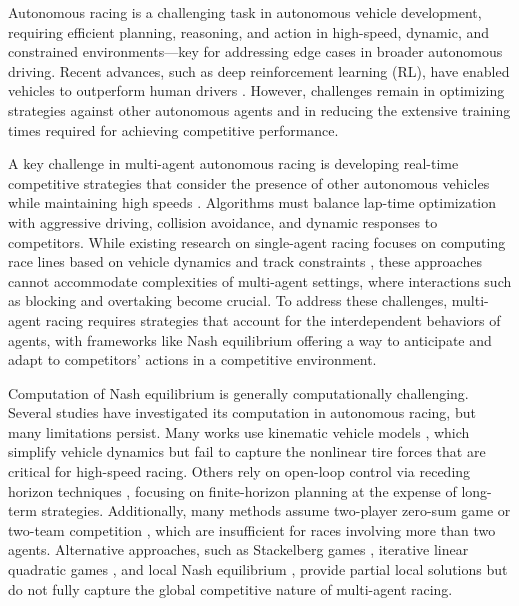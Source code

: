 Autonomous racing is a challenging task in autonomous vehicle development, requiring efficient planning, reasoning, and action in high-speed, dynamic, and constrained environments—key for addressing edge cases in broader autonomous driving. Recent advances, such as deep reinforcement learning (RL), have enabled vehicles to outperform human drivers \citep{wurman2022outracing, kaufmann2023champion}. However, challenges remain in optimizing strategies against other autonomous agents and in reducing the extensive training times required for achieving competitive performance.




A key challenge in multi-agent autonomous racing is developing real-time competitive strategies that consider the presence of other autonomous vehicles while maintaining high speeds \citep{betz2022autonomous}. Algorithms must balance lap-time optimization with aggressive driving, collision avoidance, and dynamic responses to competitors. While existing research on single-agent racing focuses on computing race lines based on vehicle dynamics and track constraints \citep{rosolia2017autonomous, balaji2020deepracer, song2021autonomous, herman2021learn, liniger2015optimization, kabzan2020amz}, these approaches cannot accommodate complexities of multi-agent settings, where interactions such as blocking and overtaking become crucial. To address these challenges, multi-agent racing requires strategies that account for the interdependent behaviors of agents, with frameworks like Nash equilibrium offering a way to anticipate and adapt to competitors' actions in a competitive environment.



Computation of Nash equilibrium is generally computationally challenging. Several studies have investigated its computation in autonomous racing, but many limitations persist. Many works use kinematic vehicle models \citep{notomista2020enhancing, wang2019bgame, wang2021game, liniger2019noncooperative, jia2023rapid, williams2017autonomous, sinha2020formulazero, schwarting2021stochastic}, which simplify vehicle dynamics but fail to capture the nonlinear tire forces that are critical for high-speed racing. Others rely on open-loop control via receding horizon techniques \citep{buyval2017deriving, jung2021game, wang2019bgame, wang2021game, liniger2019noncooperative, jia2023rapid, schwarting2021stochastic, zhu2023sequential, zhu2024sequential}, focusing on finite-horizon planning at the expense of long-term strategies. Additionally, many methods assume two-player zero-sum game \citep{wang2019bgame, thakkar2022hierarchical, kalaria2023towards,zheng2022game} or two-team competition \citep{thakkar2024hierarchical}, which are insufficient for races involving more than two agents. Alternative approaches, such as Stackelberg games \citep{notomista2020enhancing, liniger2019noncooperative}, iterative linear quadratic games \citep{schwarting2021stochastic}, and local Nash equilibrium \citep{zhu2023sequential, zhu2024sequential}, provide partial local solutions but do not fully capture the global competitive nature of multi-agent racing.

